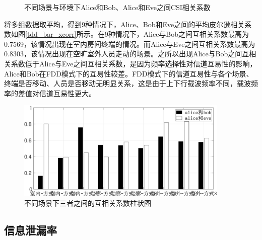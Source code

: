 \documentclass[master]{seuthesis} %
\begin{document}
\begin{Main}
\begin{figure}
{    }
    \caption{不同场景与环境下Alice和Bob、Alice和Eve之间CSI相关系数}{} %
    \label{fdd_csi_xcorr}
\end{figure}

将多组数据取平均，得到9种情况下，Alice、Bob和Eve之间的平均皮尔逊相关系数如图\ref{tdd_bar_xcorr}所示。在9种情况下，Alice与Bob之间互相关系数最高为0.7569，该情况出现在室内房间终端的情况。而Alice与Eve之间互相关系数最高为0.8303，该情况出现在空旷室外人员走动的场景。之所以出现Alice与Bob之间互相关系数低于Alice与Eve之间互相关系数，是因为频率选择性对信道互易性的影响，Alice和Bob在FDD模式下的互易性较差。FDD模式下的信道互易性与各个场景、终端是否移动、人员是否移动无明显关系，这是由于上下行载波频率不同，载波频率的差值对信道互易性更大。

\begin{figure}[htbp!]
    \centering \includegraphics[width=0.9\textwidth]{images/fdd-xcorr/bar.eps}
    \caption{不同场景下三者之间的互相关系数柱状图}
    \label{fdd_bar_xcorr}
\end{figure}

\subsection{信息泄漏率}


\end{Main}
\end{document}
